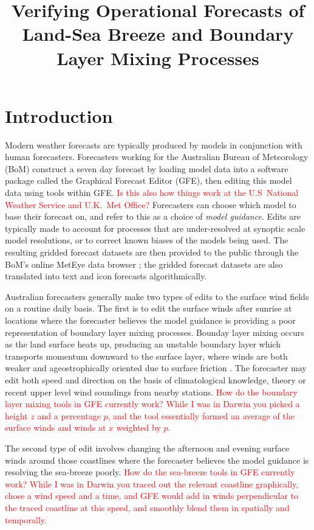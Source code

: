\documentclass{ametsoc}
\title{Verifying Operational Forecasts of Land-Sea Breeze and Boundary Layer Mixing Processes}
\affiliation{School of Earth Sciences, and ARC Centre of Excellence for Climate Extremes, The University of Melbourne, Melbourne, Victoria, Australia.}
\begin{document}
\maketitle

\section{Introduction}
\label{Sec:Introduction}
Modern weather forecasts are typically produced by models in conjunction with human forecasters. Forecasters working for the Australian Bureau of Meteorology (BoM) construct a seven day forecast by loading model data into a software package called the Graphical Forecast Editor (GFE), then editing this model data using tools within GFE. \textcolor{red}{Is this also how things work at the U.S~National Weather Service and U.K.~Met Office?} Forecasters can choose which model to base their forecast on, and refer to this as a choice of \textit{model guidance}. Edits are typically made to account for processes that are under-resolved at synoptic scale model resolutions, or to correct known biases of the models being used. The resulting gridded forecast datasets are then provided to the public through the BoM's online MetEye data browser \citep{bomMetEye19}; the gridded forecast datasets are also translated into text and icon forecasts algorithmically.  

Australian forecasters generally make two types of edits to the surface wind fields on a routine daily basis. The first is to edit the surface winds after sunrise at locations where the forecaster believes the model guidance is providing a poor representation of boundary layer mixing processes. Bounday layer mixing occurs as the land surface heats up, producing an unstable boundary layer which transports momentum downward to the surface layer, where winds are both weaker and ageostrophically oriented due to surface friction \citep{lee18}. The forecaster may edit both speed and direction on the basis of climatological knowledge, theory or recent upper level wind soundings from nearby stations. \textcolor{red}{How do the boundary layer mixing tools in GFE currently work? While I was in Darwin you picked a height $z$ and a percentage $p$, and the tool essentially formed an average of the surface winds and winds at $x$ weighted by $p$.}

The second type of edit involves changing the afternoon and evening surface winds around those coastlines where the forecaster believes the model guidance is resolving the sea-breeze poorly. \textcolor{red}{How do the sea-breeze tools in GFE currently work? While I was in Darwin you traced out the relevant coastline graphically, chose a wind speed and a time, and GFE would add in winds perpendicular to the traced coastline at this speed, and smoothly blend them in spatially and temporally.} 
\end{document}
